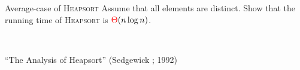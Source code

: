 \begin{frame}{}
  \begin{exampleblock}{Average-case of \textsc{Heapsort}}
    Assume that all elements are distinct. 
    Show that the  running time of \textsc{Heapsort} is $\textcolor{red}{\Theta}(n \log n)$.
  \end{exampleblock}

  \vspace{0.50cm}
  \begin{columns}
      \pause
      \pause
  \end{columns}
\end{frame}

\begin{frame}{}
  \begin{center}
    {} \\[10pt]
    {``The Analysis of Heapsort'' (Sedgewick ; 1992)}
  \end{center}

  \begin{columns}
      \centerline{}
    \pause
      \centerline{}
  \end{columns}

  \vspace{0.50cm}
  \centerline{}
\end{frame}

% 
% 
% 

% 
